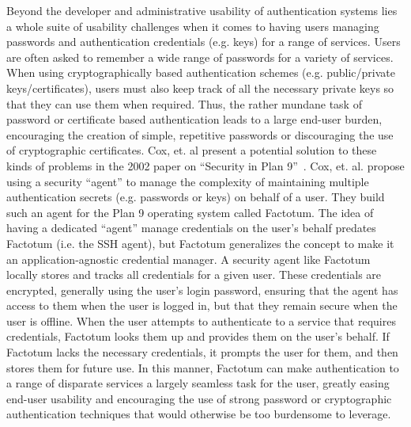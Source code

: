 \documentclass{sig-alternate}
\begin{document}
Beyond the developer and administrative usability of authentication
systems lies a whole suite of usability challenges when it comes to
having users managing passwords and authentication credentials
(e.g. keys) for a range of services. Users are often asked to remember
a wide range of passwords for a variety of services. When using
cryptographically based authentication schemes (e.g. public/private
keys/certificates), users must also keep track of all the necessary
private keys so that they can use them when required. Thus, the rather
mundane task of password or certificate based authentication leads to
a large end-user burden, encouraging the creation of simple,
repetitive passwords or discouraging the use of cryptographic
certificates. Cox, et. al present a potential solution to these kinds
of problems in the 2002 paper on ``Security in Plan
9''~\cite{Cox2002}. Cox, et. al. propose using a security ``agent'' to
manage the complexity of maintaining multiple authentication secrets
(e.g. passwords or keys) on behalf of a user. They build such an agent
for the Plan 9 operating system called Factotum. The idea of having a
dedicated ``agent'' manage credentials on the user's behalf predates
Factotum (i.e. the SSH agent), but Factotum generalizes the concept to
make it an application-agnostic credential manager. A security agent
like Factotum locally stores and tracks all credentials for a given
user. These credentials are encrypted, generally using the user's
login password, ensuring that the agent has access to them when the
user is logged in, but that they remain secure when the user is
offline. When the user attempts to authenticate to a service that
requires credentials, Factotum looks them up and provides them on the
user's behalf. If Factotum lacks the necessary credentials, it prompts
the user for them, and then stores them for future use. In this
manner, Factotum can make authentication to a range of disparate
services a largely seamless task for the user, greatly easing end-user
usability and encouraging the use of strong password or cryptographic
authentication techniques that would otherwise be too burdensome to
leverage.
\end{document}
